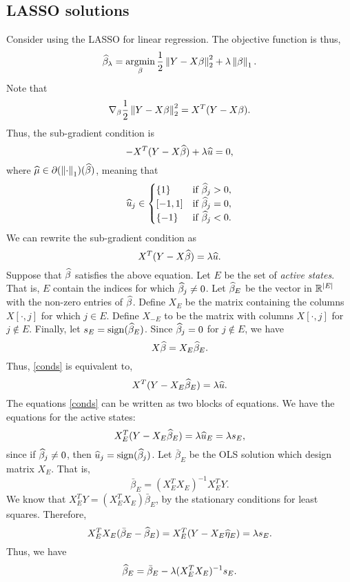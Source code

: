 \subsection{LASSO solutions}
Consider using the LASSO for linear regression. The objective function is thus,
\[\widehat{\beta}_\lambda = \operatorname*{argmin}_\beta \frac{1}{2}\left\|Y-X\beta\right\|_2^2 + \lambda \left\|\beta\right\|_1. \]
Note that 
\[\nabla_\beta \frac{1}{2}\left\|Y-X\beta\right\|_2^2 = X^T(Y-X\beta). \]
Thus, the sub-gradient condition is 
\[-X^T(Y-X\widehat{\beta}) +\lambda  \widehat{u} = 0, \]
where $\widehat{\mu} \in \partial(\left\|\cdot\right\|_1)(\widehat{\beta})$, meaning that
\[\widehat{u}_j \in \begin{cases} \{1\} &\text{if } \widehat{\beta}_j > 0,\\
    [-1,1] & \text{if } \widehat{\beta}_j = 0,\\
    \{-1\} & \text{if } \widehat{\beta}_j < 0.\end{cases}
     \]
 We can rewrite the sub-gradient condition as 
 \begin{equation}\label{conds}X^T(Y-X\widehat{\beta}) = \lambda \widehat{u}.\end{equation}
 Suppose that $\widehat{\beta}$ satisfies the above equation. Let $E$ be the set of \emph{active states}. That is, $E$ contain the indices for which $\widehat{\beta}_j \neq 0$. Let $\widehat{\beta}_E$ be the vector in ${\mathbb R}^{{\left\lvert E\right\rvert}}$ with the non-zero entries of $\widehat{\beta}$. Define $X_E$ be the matrix containing the columns $X[\cdot,j]$ for which $j \in E$. Define $X_{-E}$ to be the matrix with columns $X[\cdot,j]$ for $j \notin  E$. Finally, let $s_E = \operatorname{sign}(\widehat{\beta}_E)$. Since $\widehat{\beta}_j = 0$ for $j \notin E$, we have 
 \[X\widehat{\beta} = X_E\widehat{\beta}_E. \]
 Thus, \eqref{conds} is equivalent to,
\[X^T(Y-X_E\widehat{\beta}_E) = \lambda \widehat{u}. \]
 The equations \eqref{conds} can be written as two blocks of equations. We have the equations for the active states:
 \begin{equation}\label{active1}
    X_E^T(Y-X_E\widehat{\beta}_E) = \lambda\widehat{u}_E = \lambda s_E, \end{equation}
 since if $\widehat{\beta}_j \neq 0$, then $\widehat{u}_j = \operatorname{sign}(\widehat{\beta}_j)$. Let $\bar{\beta}_E$ be the OLS solution which design matrix $X_E$. That is,
 \[\bar{\beta}_E = (X_E^TX_E)^{-1}X_E^TY. \]
 We know that $X_E^TY = (X_E^TX_E)\bar{\beta}_E$, by the stationary conditions for least squares.   Therefore,
 \[X_E^TX_E(\bar{\beta}_E-\widehat{\beta}_E) = X_E^T(Y-X_E\widehat{\eta}_E) = \lambda s_E. \]
 Thus, we have 
 \begin{equation}\label{active2}\widehat{\beta}_E = \bar{\beta}_E - \lambda (X_E^TX_E)^{-1}s_E. \end{equation}

